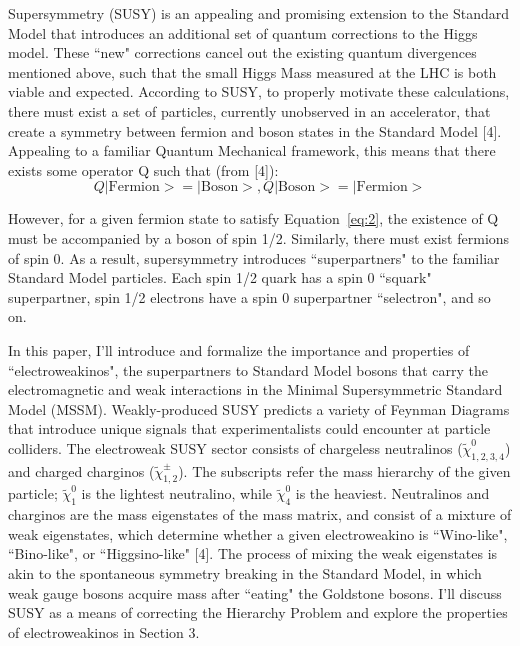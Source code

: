 \documentclass{article}
\begin{document}
\par
Supersymmetry (SUSY) is an appealing and promising extension to the Standard Model that introduces an additional set of quantum corrections to the Higgs model. These ``new" corrections cancel out the existing quantum divergences mentioned above, such that the small Higgs Mass measured at the LHC is both viable and expected. According to SUSY, to properly motivate these calculations, there must exist a set of particles, currently unobserved in an accelerator, that create a symmetry between fermion and boson states in the Standard Model [4]. Appealing to a familiar Quantum Mechanical framework, this means that there exists some operator Q such that (from [4]):
\begin{equation} \label{eq:2}
Q|\text{Fermion}> = |\text{Boson}>, Q|\text{Boson}> = |\text{Fermion}>
\end{equation}
\par
However, for a given fermion state to satisfy Equation~\ref{eq:2}, the existence of Q must be accompanied by a boson of spin 1/2. Similarly, there must exist fermions of spin 0. As a result, supersymmetry introduces ``superpartners"  to the familiar Standard Model particles. Each spin 1/2 quark has a spin 0 ``squark"  superpartner, spin 1/2 electrons have a spin 0 superpartner ``selectron", and so on.
\par
In this paper, I'll introduce and formalize the importance and properties of ``electroweakinos", the superpartners to Standard Model bosons that carry the electromagnetic and weak interactions in the Minimal Supersymmetric Standard Model (MSSM). Weakly-produced SUSY predicts a variety of Feynman Diagrams that introduce unique signals that experimentalists could encounter at particle colliders. The electroweak SUSY sector consists of chargeless neutralinos ($\tilde{\chi}^{0}_{1,2,3,4}$) and charged charginos ($\tilde{\chi}^{\pm}_{1,2}$). The subscripts refer the mass hierarchy of the given particle; $\tilde{\chi}^{0}_{1}$ is the lightest neutralino, while $\tilde{\chi}^{0}_{4}$ is the heaviest. Neutralinos and charginos are the mass eigenstates of the mass matrix, and consist of a mixture of weak eigenstates, which determine whether a given electroweakino is ``Wino-like", ``Bino-like", or ``Higgsino-like"  [4]. The process of mixing the weak eigenstates is akin to the spontaneous symmetry breaking in the Standard Model, in which weak gauge bosons acquire mass after ``eating"  the Goldstone bosons. I'll discuss SUSY as a means of correcting the Hierarchy Problem and explore the properties of electroweakinos in Section 3.
\end{document}
